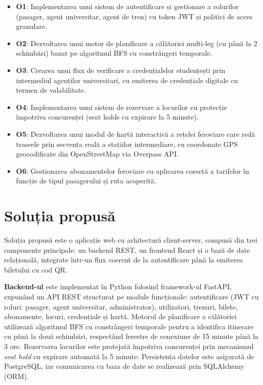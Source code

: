 \documentclass[12pt,a4paper]{report}
\begin{document}
\begin{itemize}
  \item \textbf{O1}: Implementarea unui sistem de autentificare și gestionare a rolurilor (pasager, agent universitar, agent de tren) cu token JWT și politici de acces granulare.
  \item \textbf{O2}: Dezvoltarea unui motor de planificare a călătoriei multi-leg (cu până la 2 schimbări) bazat pe algoritmul BFS cu constrângeri temporale.
  \item \textbf{O3}: Crearea unui flux de verificare a credențialelor studențești prin intermediul agenților universitari, cu emiterea de credențiale digitale cu termen de valabilitate.
  \item \textbf{O4}: Implementarea unui sistem de rezervare a locurilor cu protecție împotriva concurenței (seat holds cu expirare la 5 minute).
  \item \textbf{O5}: Dezvoltarea unui modul de hartă interactivă a rețelei feroviare care redă traseele prin secvența reală a stațiilor intermediare, cu coordonate GPS geocodificate din OpenStreetMap via Overpass API.
  \item \textbf{O6}: Gestionarea abonamentelor feroviare cu aplicarea corectă a tarifelor în funcție de tipul pasagerului și ruta acoperită.
\end{itemize}

\section{Soluția propusă}

Soluția propusă este o aplicație web cu arhitectură client-server, compusă din trei componente principale: un backend REST, un frontend React și o bază de date relațională, integrate într-un flux coerent de la autentificare până la emiterea biletului cu cod QR.

\textbf{Backend-ul} este implementat în Python folosind framework-ul FastAPI, expunând un API REST structurat pe module funcționale: autentificare (JWT cu roluri: pasager, agent universitar, administrator), utilizatori, trenuri, bilete, abonamente, locuri, credențiale și hartă. Motorul de planificare a călătoriei utilizează algoritmul BFS cu constrângeri temporale pentru a identifica itinerare cu până la două schimbări, respectând ferestre de conexiune de 15 minute până la 3 ore. Rezervarea locurilor este protejată împotriva concurenței prin mecanismul \textit{seat hold} cu expirare automată la 5 minute. Persistența datelor este asigurată de PostgreSQL, iar comunicarea cu baza de date se realizează prin SQLAlchemy (ORM).
\end{document}
